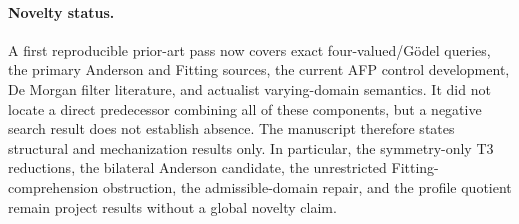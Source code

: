 \paragraph{Novelty status.}
A first reproducible prior-art pass now covers exact four-valued/G\"odel queries, the primary Anderson and Fitting sources, the current AFP control development, De Morgan filter literature, and actualist varying-domain semantics. It did not locate a direct predecessor combining all of these components, but a negative search result does not establish absence. The manuscript therefore states structural and mechanization results only. In particular, the symmetry-only T3 reductions, the bilateral Anderson candidate, the unrestricted Fitting-comprehension obstruction, the admissible-domain repair, and the profile quotient remain project results without a global novelty claim.

